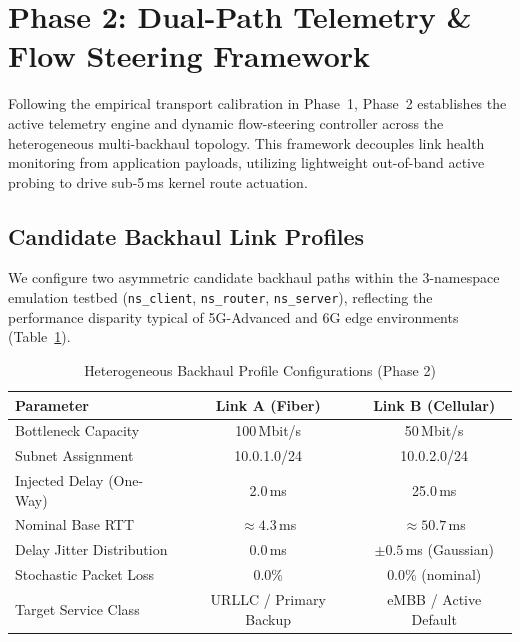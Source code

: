 
\section{Phase 2: Dual-Path Telemetry \& Flow Steering Framework}
\label{sec:phase2_telemetry}

Following the empirical transport calibration in Phase~1, Phase~2 establishes the active telemetry engine and dynamic flow-steering controller across the heterogeneous multi-backhaul topology. This framework decouples link health monitoring from application payloads, utilizing lightweight out-of-band active probing to drive sub-5\,ms kernel route actuation.

\subsection{Candidate Backhaul Link Profiles}
\label{subsec:backhaul_profiles}

We configure two asymmetric candidate backhaul paths within the 3-namespace emulation testbed (\texttt{ns\_client}, \texttt{ns\_router}, \texttt{ns\_server}), reflecting the performance disparity typical of 5G-Advanced and 6G edge environments (Table~\ref{tab:phase2_profiles}).

\begin{table}[htbp]
\caption{Heterogeneous Backhaul Profile Configurations (Phase 2)}
\label{tab:phase2_profiles}
\centering
\begin{tabular}{lcc}
\toprule
\textbf{Parameter} & \textbf{Link A (Fiber)} & \textbf{Link B (Cellular)} \\
\midrule
Bottleneck Capacity & 100\,Mbit/s & 50\,Mbit/s \\
Subnet Assignment & 10.0.1.0/24 & 10.0.2.0/24 \\
Injected Delay (One-Way) & 2.0\,ms & 25.0\,ms \\
Nominal Base RTT & $\approx 4.3$\,ms & $\approx 50.7$\,ms \\
Delay Jitter Distribution & 0.0\,ms & $\pm 0.5$\,ms (Gaussian) \\
Stochastic Packet Loss & 0.0\% & 0.0\% (nominal) \\
Target Service Class & URLLC / Primary Backup & eMBB / Active Default \\
\bottomrule
\end{tabular}
\end{table}

